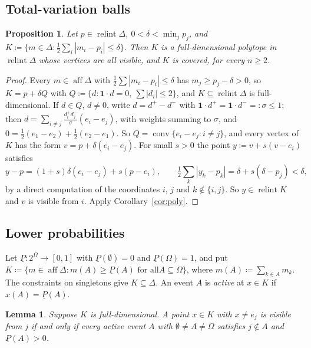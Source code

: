 \documentclass[11pt]{article}
\newcommand{\one}{\mathbf{1}}
\DeclareMathOperator{\conv}{conv}
\DeclareMathOperator{\relint}{relint}
\DeclareMathOperator{\aff}{aff}
\theoremstyle{plain}
\newtheorem{proposition}[theorem]{Proposition}
\newtheorem{lemma}[theorem]{Lemma}
\theoremstyle{definition}
\theoremstyle{remark}
\begin{document}
\subsection{Total-variation balls}

\begin{proposition}\label{prop:tv}
Let $p\in\relint\Delta$, $0<\delta<\min_jp_j$, and $K\coloneqq\{m\in\Delta:\frac12\sum_i
|m_i-p_i|\le\delta\}$. Then $K$ is a full-dimensional polytope in $\relint\Delta$ whose
vertices are all visible, and $K$ is covered, for every $n\ge2$.
\end{proposition}

\begin{proof}
Every $m\in\aff\Delta$ with $\frac12\sum|m_i-p_i|\le\delta$ has $m_j\ge p_j-\delta>0$, so
$K=p+\delta Q$ with $Q\coloneqq\{d:\one\cdot d=0,\ \sum|d_i|\le2\}$, and $K\subseteq
\relint\Delta$ is full-dimensional. If $d\in Q$, $d\ne0$, write $d=d^+-d^-$ with
$\one\cdot d^+=\one\cdot d^-=:\sigma\le1$; then $d=\sum_{i\neq j}\frac{d^+_id^-_j}\sigma
(e_i-e_j)$, with weights summing to $\sigma$, and $0=\frac12(e_1-e_2)+\frac12(e_2-e_1)$.
So $Q=\conv\{e_i-e_j:i\neq j\}$, and every vertex of $K$ has the form $v=p+\delta(e_i-e_j)$.
For small $s>0$ the point $y\coloneqq v+s(v-e_i)$ satisfies
\[
  y-p=(1+s)\delta(e_i-e_j)+s(p-e_i),\qquad
  \tfrac12\textstyle\sum_k|y_k-p_k|=\delta+s(\delta-p_j)<\delta ,
\]
by a direct computation of the coordinates $i$, $j$ and $k\notin\{i,j\}$. So $y\in\relint K$
and $v$ is visible from $i$. Apply Corollary~\ref{cor:poly}.
\end{proof}

\subsection{Lower probabilities}

Let $\underline P:2^\Omega\to[0,1]$ with $\underline P(\emptyset)=0$ and $\underline
P(\Omega)=1$, and put $K\coloneqq\{m\in\aff\Delta:m(A)\ge\underline P(A)\text{ for all
}A\subseteq\Omega\}$, where $m(A)\coloneqq\sum_{k\in A}m_k$. The constraints on singletons
give $K\subseteq\Delta$. An event $A$ is \emph{active} at $x\in K$ if $x(A)=\underline
P(A)$.

\begin{lemma}\label{lem:events}
Suppose $K$ is full-dimensional. A point $x\in K$ with $x\neq e_j$ is visible from $j$ if
and only if every active event $A$ with $\emptyset\neq A\neq\Omega$ satisfies $j\notin A$
and $\underline P(A)>0$.
\end{lemma}
\end{document}
